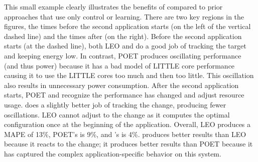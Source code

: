 This small example clearly illustrates the benefits of \SYSTEM{}
compared to prior approaches that use only control or learning.  There
are two key regions in the figures, the times before the second
application starts (on the left of the vertical dashed line) and the
times after (on the right).  Before the second application starts (at
the dashed line), both LEO and \SYSTEM{} do a good job of tracking the
target and keeping energy low.  In contrast, POET produces oscillating
performance (and thus power) because it has a bad model of LITTLE core
performance causing it to use the LITTLE cores too much and then too
little.  This oscillation also results in unnecessary power
consumption.  After the second application starts, POET and \SYSTEM{}
recognize the performance has changed and adjust resource usage.
\SYSTEM{} does a slightly better job of tracking the change, producing
fewer oscillations.  LEO cannot adjust to the change as it computes
the optimal configuration once at the beginning of the application.
Overall, LEO produces a MAPE of 13\%, POET's is 9\%, and \SYSTEM{}'s
is 4\%.  \SYSTEM{} produces better results than LEO because it reacts
to the change; it produces better results than POET because it has
captured the complex application-specific behavior on this system.







